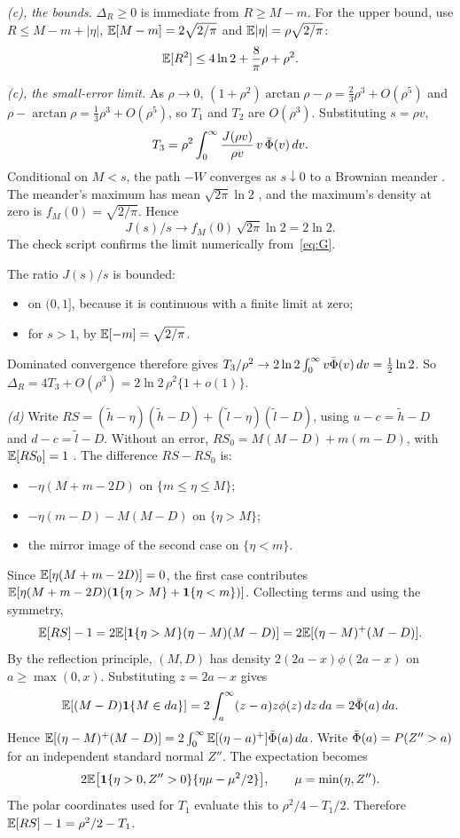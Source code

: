 \emph{(c), the bounds.} $\Delta_R\ge0$ is immediate from $R\ge M-m$. For the upper bound, use
$R\le M-m+|\eta|$, $\mathbb{E}[M-m]=2\sqrt{2/\pi}$ and $\mathbb{E}|\eta|=\rho\sqrt{2/\pi}$:
\[
  \mathbb{E}[R^2]\le4\ln2+\frac{8}{\pi}\rho+\rho^2.
\]

\emph{(c), the small-error limit.} As $\rho\to0$, $(1+\rho^2)\arctan\rho-\rho=\tfrac23\rho^3+O(\rho^5)$ and
$\rho-\arctan\rho=\tfrac13\rho^3+O(\rho^5)$, so $T_1$ and $T_2$ are $O(\rho^3)$. Substituting
$s=\rho v$,
\[
  T_3=\rho^2\int_0^\infty\frac{J(\rho v)}{\rho v}\,v\,\bar\Phi(v)\,dv.
\]
Conditional on $M<s$, the path $-W$ converges as $s\downarrow0$ to a Brownian meander
\citep{DurrettIglehartMiller1977}. The meander's maximum has mean $\sqrt{2\pi}\ln2$
\citep{DurrettIglehart1977}, and the maximum's density at zero is $f_M(0)=\sqrt{2/\pi}$.
Hence
\[
  J(s)/s\to f_M(0)\,\sqrt{2\pi}\ln2=2\ln2.
\]
The check script confirms the limit numerically from~\eqref{eq:G}.

The ratio $J(s)/s$ is bounded:
\begin{itemize}
  \item on $(0,1]$, because it is continuous with a finite limit at zero;
  \item for $s>1$, by $\mathbb{E}[-m]=\sqrt{2/\pi}$.
\end{itemize}
Dominated convergence therefore gives $T_3/\rho^2\to2\ln2\int_0^\infty v\bar\Phi(v)\,dv=\tfrac12\ln2$.
So $\Delta_R=4T_3+O(\rho^3)=2\ln2\,\rho^2\{1+o(1)\}$.

\emph{(d)} Write $RS=(\tilde h-\eta)(\tilde h-D)+(\tilde l-\eta)(\tilde l-D)$, using
$u-c=\tilde h-D$ and $d-c=\tilde l-D$. Without an error, $RS_0=M(M-D)+m(m-D)$, with
$\mathbb{E}[RS_0]=1$ \citep{RogersSatchell1991}. The difference $RS-RS_0$ is:
\begin{itemize}
  \item $-\eta(M+m-2D)$ on $\{m\le\eta\le M\}$;
  \item $-\eta(m-D)-M(M-D)$ on $\{\eta>M\}$;
  \item the mirror image of the second case on $\{\eta<m\}$.
\end{itemize}
Since $\mathbb{E}[\eta(M+m-2D)]=0$, the first case contributes
$\mathbb{E}[\eta(M+m-2D)(\mathbf{1}\{\eta>M\}+\mathbf{1}\{\eta<m\})]$. Collecting terms and using the symmetry,
\[
  \mathbb{E}[RS]-1=2\mathbb{E}[\mathbf{1}\{\eta>M\}(\eta-M)(M-D)]=2\mathbb{E}[(\eta-M)^+(M-D)].
\]
By the reflection principle, $(M,D)$ has density $2(2a-x)\phi(2a-x)$ on $a\ge\max(0,x)$.
Substituting $z=2a-x$ gives
\[
  \mathbb{E}[(M-D)\mathbf{1}\{M\in da\}]=2\int_a^\infty(z-a)z\phi(z)\,dz\,da=2\bar\Phi(a)\,da.
\]
Hence $\mathbb{E}[(\eta-M)^+(M-D)]=2\int_0^\infty\mathbb{E}[(\eta-a)^+]\bar\Phi(a)\,da$. Write
$\bar\Phi(a)=P(Z''>a)$ for an independent standard normal $Z''$. The expectation becomes
\[
  2\mathbb{E}\bigl[\mathbf{1}\{\eta>0,Z''>0\}\{\eta\mu-\mu^2/2\}\bigr],\qquad \mu=\min(\eta,Z'').
\]
The polar coordinates used for $T_1$ evaluate this to $\rho^2/4-T_1/2$. Therefore
$\mathbb{E}[RS]-1=\rho^2/2-T_1$.

